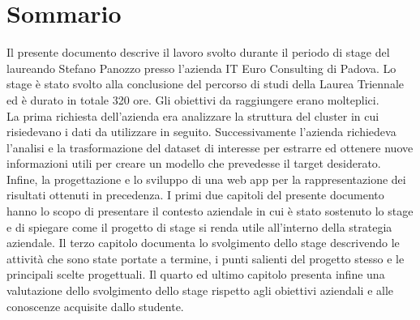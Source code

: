 
\cleardoublepage
{}
{}
\begingroup
\let\clearpage\relax
\let\cleardoublepage\relax
\let\cleardoublepage\relax

\chapter*{Sommario}

Il presente documento descrive il lavoro svolto durante il periodo di stage del laureando Stefano Panozzo presso l'azienda IT Euro Consulting di Padova. Lo stage è stato svolto alla conclusione del percorso di studi della Laurea Triennale ed è durato in totale 320 ore.
Gli obiettivi da raggiungere erano molteplici.\\
La prima richiesta dell'azienda era analizzare la struttura del \gls{cluster} in cui risiedevano i dati da utilizzare in seguito. 
Successivamente l'azienda richiedeva l'analisi e la trasformazione del dataset di interesse per estrarre ed ottenere nuove informazioni utili per creare un modello che prevedesse il target desiderato. 
Infine, la progettazione e lo sviluppo di una \gls{web app} per la rappresentazione dei risultati ottenuti in precedenza.
I primi due capitoli del presente documento hanno lo scopo di presentare il contesto aziendale in cui è stato sostenuto lo stage e di spiegare come il progetto di stage si renda utile all’interno della strategia aziendale. Il terzo capitolo documenta lo svolgimento dello stage descrivendo le attività che sono state portate a termine, i punti salienti del progetto stesso e le principali scelte progettuali. Il quarto ed ultimo capitolo presenta infine una valutazione dello svolgimento dello stage rispetto agli obiettivi aziendali e alle conoscenze acquisite dallo studente.

%
%

\endgroup			

\vfill

